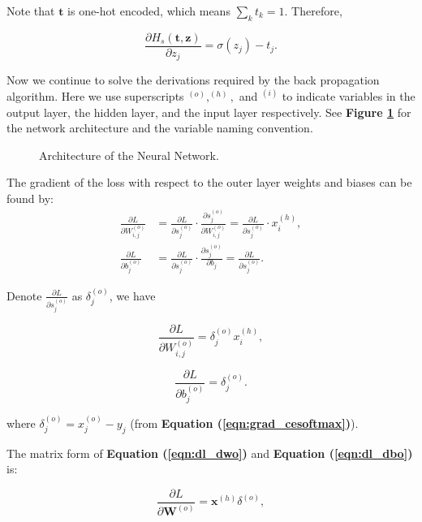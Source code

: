 \documentclass[12pt]{article}
\newcommand{\parder}[2] {
  \frac{\partial{#1} }{\partial{#2}}
}
\begin{document}
Note that $\textbf{t}$ is one-hot encoded, which means $\sum_k t_k = 1$. Therefore,

\begin{equation}
  \label{eqn:grad_cesoftmax}
\parder{H_s(\textbf{t}, \textbf{z})}{z_j} = \sigma(z_j)-t_j.
\end{equation}

\bigskip

Now we continue to solve the derivations required by the back propagation algorithm.
Here we use superscripts $^{(o)}, ^{(h)}, $ and $^{(i)}$
to indicate variables in the output layer, the hidden layer, and the input layer respectively. See \textbf{Figure \ref{fig:nn-arch}} for the network architecture and the variable naming convention.

\begin{figure}[!htb]
    \centering
    
    \caption{Architecture of the Neural Network.}
    \label{fig:nn-arch}
\end{figure}


The gradient of the loss with respect to the outer layer weights and biases can be found by:
\begin{align*}
\parder{L}{W_{i,j}^{(o)}} &= \parder{L}{s_j^{(o)}} \cdot \parder{s_j^{(o)}}{W_{i,j}^{(o)}} = \parder{L}{s_j^{(o)}} \cdot x_i^{(h)}, \\
\parder{L}{b_j^{(o)}} &= \parder{L}{s_j^{(o)}} \cdot \parder{s_j^{(o)}}{b_j} = \parder{L}{s_j^{(o)}}.
\end{align*}

Denote $\parder{L}{s_j^{(o)}}$ as $\delta_j^{(o)}$, we have

\begin{equation}
\label{eqn:dl_dwo}
\parder{L}{W_{i,j}^{(o)}} = \delta_j^{(o)} x_i^{(h)},
\end{equation}

\begin{equation}
\label{eqn:dl_dbo}
\parder{L}{b_j^{(o)}} = \delta_j^{(o)}.
\end{equation}

where $\delta_j^{(o)} = x_j^{(o)} - y_j$ (from \textbf{Equation (\ref{eqn:grad_cesoftmax})}).

\bigskip

The matrix form of \textbf{Equation (\ref{eqn:dl_dwo})} and \textbf{Equation (\ref{eqn:dl_dbo})} is:

\begin{equation}
\label{eqn:m_dl_dwo}
\parder{L}{\textbf{W}^{(o)}} = \textbf{x}^{(h)} \delta^{(o)},
\end{equation}
\end{document}
